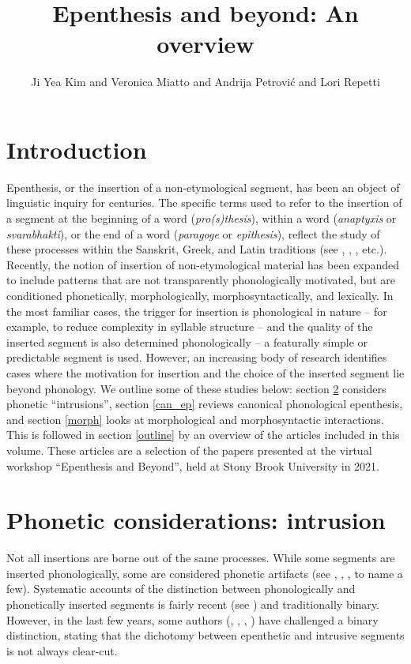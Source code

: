 \documentclass[output=paper,colorlinks,citecolor=brown]{langscibook}
\title{Epenthesis and beyond: An overview}
\author{Ji Yea Kim\orcid{}\affiliation{Gyeongsang National University} and Veronica Miatto\orcid{}\affiliation{Stony Brook University} and Andrija Petrović\orcid{}\affiliation{Stony Brook University} and Lori Repetti\orcid{}\affiliation{Stony Brook University}}
\begin{document}
\maketitle \label{ch1}

\section{Introduction} 
Epenthesis, or the insertion of a non-etymological segment, has been an object of linguistic inquiry for centuries. The specific terms used to refer to the insertion of a segment at the beginning of a word (\textit{pro(s)thesis}), within a word (\textit{anaptyxis} or \textit{svarabhakti}), or the end of a word (\textit{paragoge} or \textit{epithesis}), reflect the study of these processes within the Sanskrit, Greek, and Latin traditions (see \citealt{Kiparsky2022}, \citealt{Sen2022}, \citealt{OnigaRe2021}, etc.). Recently, the notion of insertion of non-etymological material has been expanded to include patterns that are not transparently phonologically motivated, but are conditioned phonetically, morphologically, morphosyntactically, and lexically. In the most familiar cases, the trigger for insertion is phonological in nature – for example, to reduce complexity in syllable structure – and the quality of the inserted segment is also determined phonologically – a featurally simple or predictable segment is used. However, an increasing body of research identifies cases where the motivation for insertion and the choice of the inserted segment lie beyond phonology. We outline some of these studies below: section \ref{intrusion} considers phonetic “intrusions”, section \ref{can_ep} reviews canonical phonological epenthesis, and section \ref{morph} looks at morphological and morphosyntactic interactions. This is followed in section \ref{outline} by an overview of the articles included in this volume. These articles are a selection of the papers presented at the virtual workshop “Epenthesis and Beyond”, held at Stony Brook University in 2021.

\section{Phonetic considerations: intrusion} \label{intrusion}
Not all insertions are borne out of the same processes. While some segments are inserted phonologically, some are considered phonetic artifacts (see \citealt{Ohala1974}, \citealt{Alietal1979}, \citealt{Hall2006}, to name a few). Systematic accounts of the distinction between phonologically and phonetically inserted segments is fairly recent (see \citealt{Hall2004}) and traditionally binary. However, in the last few years, some authors (\citealt{Griceetal2018}, \citealt{Karlin2021}, \citealt{Hutinetal2021}, ) have challenged a binary distinction, stating that the dichotomy between epenthetic and intrusive segments is not always clear-cut.
\end{document}
